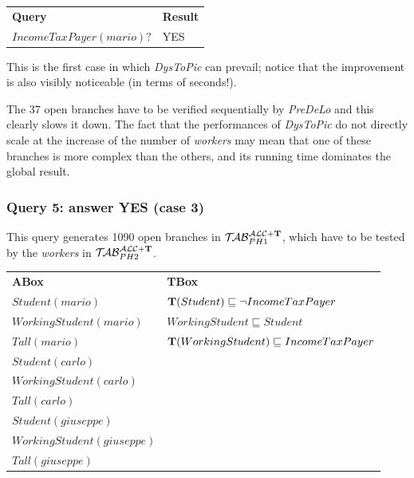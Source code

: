 \documentclass[a4paper, 11pt, oneside]{duthesis}
\newcommand{\tip}{{\bf T}}
\newcommand{\primo}{\mathrel{{\mathcal{T}\!\mathcal{AB}}}_{PH 1}^{\mathcal{ALC}+\mbox{\scriptsize $\tip$}}}
\newcommand{\secondo}{\mathrel{{\mathcal{T}\!\mathcal{AB}}}_{PH 2}^{\mathcal{ALC}+\mbox{\scriptsize $\tip$}}}
\begin{document}
\begin{tabular}{ll}
\textbf{Query} & \textbf{Result}\\
$IncomeTaxPayer(mario)?$ & YES\\
\end{tabular}

\begin{figure}[ht]
\begin{bchart}[step=5000,max=5000,unit=ms,scale=1.4]
    \medskip
    \medskip
    \medskip
    \medskip
\end{bchart}
\caption{}
\end{figure}

This is the first case in which \emph{DysToPic} can prevail; notice that the improvement is also visibly noticeable (in terms of seconds!).

The 37 open branches have to be verified sequentially by \emph{PreDeLo} and this clearly slows it down.
The fact that the performances of \emph{DysToPic} do not directly scale at the increase of the number of \emph{workers} may mean that one of these branches is more complex than the others, and its running time dominates the global result.

\newpage

\subsubsection{Query 5: answer YES (case 3)}

This query generates 1090 open branches in $\primo$, which have to be tested by the \emph{workers} in $\secondo$.\\

\begin{tabular}{ll}
	\textbf{ABox} & \textbf{TBox}\\
	$Student(mario)$ & $\tip(Student) \sqsubseteq \neg IncomeTaxPayer$\\
	$WorkingStudent(mario)$ & $WorkingStudent \sqsubseteq Student$\\
	$Tall(mario)$ & $\tip(WorkingStudent) \sqsubseteq IncomeTaxPayer$\\
	$Student(carlo)$ &\\
	$WorkingStudent(carlo)$ &\\
	$Tall(carlo)$ &\\
	$Student(giuseppe)$ &\\
	$WorkingStudent(giuseppe)$ &\\
	$Tall(giuseppe)$ &\\[0.5cm]
\end{tabular}
\end{document}
